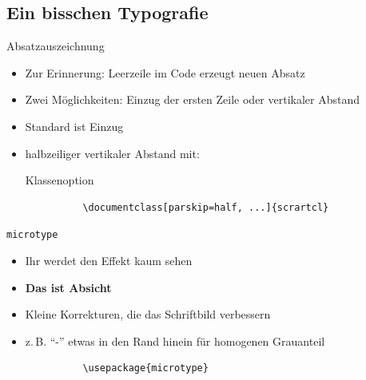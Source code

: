 \subsection{Ein bisschen Typografie}
\begin{frame}[fragile]{Absatzauszeichnung}
  \begin{itemize}
    \item Zur Erinnerung: Leerzeile im Code erzeugt neuen Absatz
    \item Zwei Möglichkeiten: Einzug der ersten Zeile oder vertikaler Abstand
    \item Standard ist Einzug
    \item halbzeiliger vertikaler Abstand mit:
      \begin{block}{Klassenoption}
        \begin{lstlisting}
          \documentclass[parskip=half, ...]{scrartcl}
        \end{lstlisting}
      \end{block}
  \end{itemize}
\end{frame}

\begin{frame}[fragile]{\texttt{microtype}}
  \begin{itemize}
    \item Ihr werdet den Effekt kaum sehen
    \item \textbf{Das ist Absicht}
    \item Kleine Korrekturen, die das Schriftbild verbessern
    \item z.\,B. \enquote{-} etwas in den Rand hinein für homogenen Grauanteil
      \begin{Packages}
        \begin{lstlisting}
          \usepackage{microtype}
        \end{lstlisting}
      \end{Packages}
  \end{itemize}
\end{frame}

